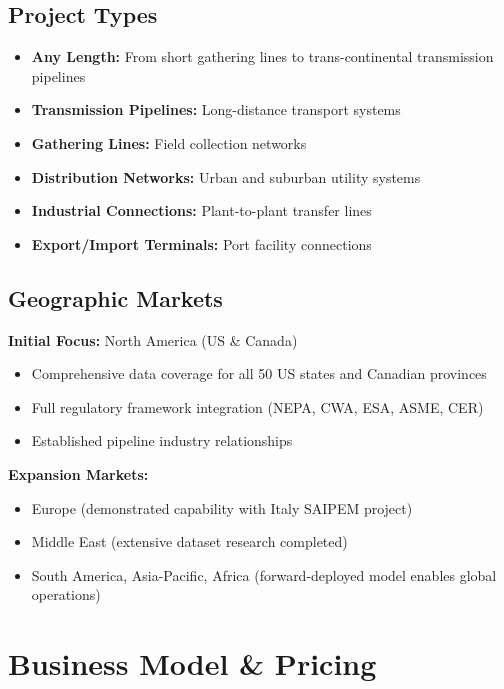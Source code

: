 \documentclass[11pt,letterpaper]{article}
\begin{document}
\subsection{Project Types}

\begin{itemize}[leftmargin=*]
    \item \textbf{Any Length:} From short gathering lines to trans-continental transmission pipelines
    \item \textbf{Transmission Pipelines:} Long-distance transport systems
    \item \textbf{Gathering Lines:} Field collection networks
    \item \textbf{Distribution Networks:} Urban and suburban utility systems
    \item \textbf{Industrial Connections:} Plant-to-plant transfer lines
    \item \textbf{Export/Import Terminals:} Port facility connections
\end{itemize}

\subsection{Geographic Markets}

\textbf{Initial Focus:} North America (US \& Canada)
\begin{itemize}[leftmargin=*]
    \item Comprehensive data coverage for all 50 US states and Canadian provinces
    \item Full regulatory framework integration (NEPA, CWA, ESA, ASME, CER)
    \item Established pipeline industry relationships
\end{itemize}

\textbf{Expansion Markets:}
\begin{itemize}[leftmargin=*]
    \item Europe (demonstrated capability with Italy SAIPEM project)
    \item Middle East (extensive dataset research completed)
    \item South America, Asia-Pacific, Africa (forward-deployed model enables global operations)
\end{itemize}

\newpage

\section{Business Model \& Pricing}
\end{document}
